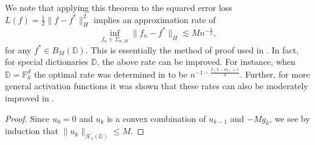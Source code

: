 We note that applying this theorem to the squared error loss $L(f) = \frac{1}{2}\|f - f^*\|_H^2$ implies an approximation rate of
\begin{equation}\label{approximation-rate}
 \inf_{f_n\in \Sigma_{n,M}} \|f_n - f^*\|_H \lesssim Mn^{-\frac{1}{2}},
\end{equation}
for any $f^*\in B_M(\mathbb{D})$. This is essentially the method of proof used in \cite{jones1992simple}. In fact, for special dictionaries $\mathbb{D}$, the above rate can be improved. For instance, when $\mathbb{D} = \mathbb{P}_k^d$ the optimal rate was determined in \cite{siegel2021optimal} to be $n^{-1-\frac{2(k-m) + 1}{d}}$. Further, for more general activation functions it was shown that these rates can also be moderately improved in \cite{siegel2020approximation}.

\begin{proof}
 Since $u_0 = 0$ and $u_k$ is a convex combination of $u_{k-1}$ and $-Mg_k$, we see by induction that $\|u_k\|_{\mathcal{K}_1(\mathbb{D})} \leq M$.
 

\end{proof}
